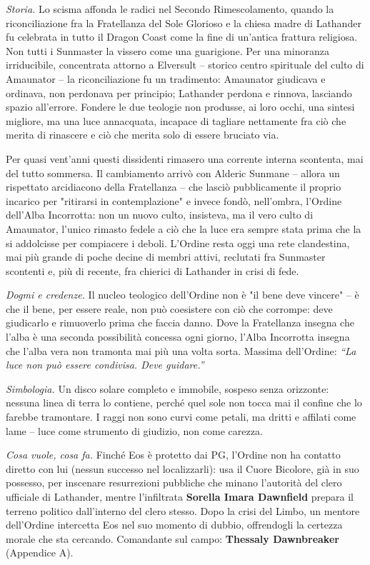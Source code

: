 \textit{Storia.} Lo scisma affonda le radici nel Secondo Rimescolamento, quando la riconciliazione fra la Fratellanza del Sole Glorioso e la chiesa madre di Lathander fu celebrata in tutto il Dragon Coast come la fine di un'antica frattura religiosa. Non tutti i Sunmaster la vissero come una guarigione. Per una minoranza irriducibile, concentrata attorno a Elversult -- storico centro spirituale del culto di Amaunator -- la riconciliazione fu un tradimento: Amaunator giudicava e ordinava, non perdonava per principio; Lathander perdona e rinnova, lasciando spazio all'errore. Fondere le due teologie non produsse, ai loro occhi, una sintesi migliore, ma una luce annacquata, incapace di tagliare nettamente fra ciò che merita di rinascere e ciò che merita solo di essere bruciato via.

Per quasi vent'anni questi dissidenti rimasero una corrente interna scontenta, mai del tutto sommersa. Il cambiamento arrivò con Alderic Sunmane -- allora un rispettato arcidiacono della Fratellanza -- che lasciò pubblicamente il proprio incarico per "ritirarsi in contemplazione" e invece fondò, nell'ombra, l'Ordine dell'Alba Incorrotta: non un nuovo culto, insisteva, ma il vero culto di Amaunator, l'unico rimasto fedele a ciò che la luce era sempre stata prima che la si addolcisse per compiacere i deboli. L'Ordine resta oggi una rete clandestina, mai più grande di poche decine di membri attivi, reclutati fra Sunmaster scontenti e, più di recente, fra chierici di Lathander in crisi di fede.

\textit{Dogmi e credenze.} Il nucleo teologico dell'Ordine non è "il bene deve vincere" -- è che il bene, per essere reale, non può coesistere con ciò che corrompe: deve giudicarlo e rimuoverlo prima che faccia danno. Dove la Fratellanza insegna che l'alba è una seconda possibilità concessa ogni giorno, l'Alba Incorrotta insegna che l'alba vera non tramonta mai più una volta sorta. Massima dell'Ordine: \textit{``La luce non può essere condivisa. Deve guidare.''}

\textit{Simbologia.} Un disco solare completo e immobile, sospeso senza orizzonte: nessuna linea di terra lo contiene, perché quel sole non tocca mai il confine che lo farebbe tramontare. I raggi non sono curvi come petali, ma dritti e affilati come lame -- luce come strumento di giudizio, non come carezza.

\textit{Cosa vuole, cosa fa.} Finché Eos è protetto dai PG, l'Ordine non ha contatto diretto con lui (nessun successo nel localizzarli): usa il Cuore Bicolore, già in suo possesso, per inscenare resurrezioni pubbliche che minano l'autorità del clero ufficiale di Lathander, mentre l'infiltrata \textbf{Sorella Imara Dawnfield} prepara il terreno politico dall'interno del clero stesso. Dopo la crisi del Limbo, un mentore dell'Ordine intercetta Eos nel suo momento di dubbio, offrendogli la certezza morale che sta cercando. Comandante sul campo: \textbf{Thessaly Dawnbreaker} (Appendice A).

